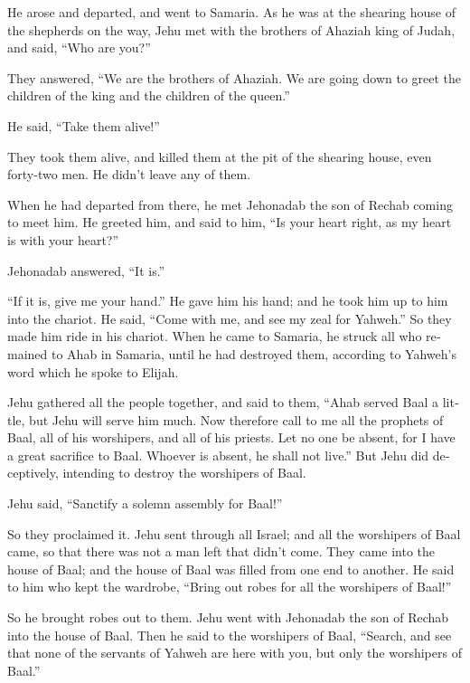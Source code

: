 \begin{paracol}{2}
\begin{otherlanguage}{english}
 He arose and departed, and went to Samaria. As he was at
the shearing house of the shepherds on the way,  Jehu met
with the brothers of Ahaziah king of Judah, and said, ``Who are you?''

They answered, ``We are the brothers of Ahaziah. We are going down to
greet the children of the king and the children of the queen.''

 He said, ``Take them alive!''

They took them alive, and killed them at the pit of the shearing house,
even forty-two men. He didn't leave any of them.

 When he had departed from there, he met Jehonadab the
son of Rechab coming to meet him. He greeted him, and said to him, ``Is
your heart right, as my heart is with your heart?''

Jehonadab answered, ``It is.''

``If it is, give me your hand.'' He gave him his hand; and he took him
up to him into the chariot.  He said, ``Come with me, and
see my zeal for Yahweh.'' So they made him ride in his chariot.
 When he came to Samaria, he struck all who remained to
Ahab in Samaria, until he had destroyed them, according to Yahweh's word
which he spoke to Elijah.

 Jehu gathered all the people together, and said to them,
``Ahab served Baal a little, but Jehu will serve him much.
 Now therefore call to me all the prophets of Baal, all
of his worshipers, and all of his priests. Let no one be absent, for I
have a great sacrifice to Baal. Whoever is absent, he shall not live.''
But Jehu did deceptively, intending to destroy the worshipers of Baal.

 Jehu said, ``Sanctify a solemn assembly for Baal!''

So they proclaimed it.  Jehu sent through all Israel; and
all the worshipers of Baal came, so that there was not a man left that
didn't come. They came into the house of Baal; and the house of Baal was
filled from one end to another.  He said to him who kept
the wardrobe, ``Bring out robes for all the worshipers of Baal!''

So he brought robes out to them.  Jehu went with
Jehonadab the son of Rechab into the house of Baal. Then he said to the
worshipers of Baal, ``Search, and see that none of the servants of
Yahweh are here with you, but only the worshipers of Baal.''


\end{otherlanguage}
\end{paracol}
